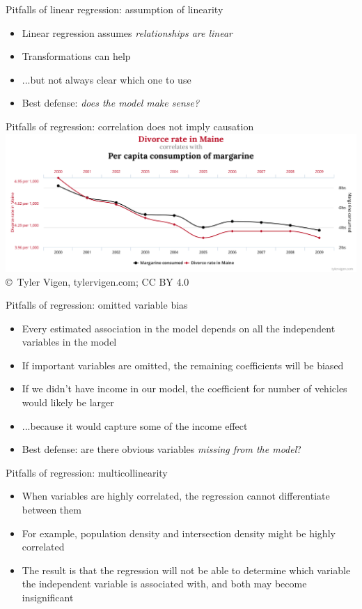 \begin{frame}{Pitfalls of linear regression: assumption of linearity}
  \begin{itemize}
    \item Linear regression assumes \emph{relationships are linear}
    \item Transformations can help
    \pause\item ...but not always clear which one to use
    \pause\item Best defense: \emph{does the model make sense?}
  \end{itemize}
\end{frame}

\begin{frame}{Pitfalls of regression: correlation does not imply causation}
  \includegraphics[width=\textwidth]{spurious_correlation.pdf}\\
  {\tiny \copyright~Tyler Vigen, tylervigen.com; CC BY 4.0}
\end{frame}

\begin{frame}{Pitfalls of regression: omitted variable bias}
  \begin{itemize}
    \item Every estimated association in the model depends on all the independent variables in the model
    \item If important variables are omitted, the remaining coefficients will be biased
    \item If we didn't have income in our model, the coefficient for number of vehicles would likely be larger
    \item ...because it would capture some of the income effect
    \pause\item Best defense: are there obvious variables \emph{missing from the model}?
  \end{itemize}
\end{frame}

\begin{frame}{Pitfalls of regression: multicollinearity}
  \begin{itemize}
    \item When variables are highly correlated, the regression cannot differentiate between them
    \item For example, population density and intersection density might be highly correlated
    \item The result is that the regression will not be able to determine which variable the independent variable is associated with, and both may become insignificant
  \end{itemize}
\end{frame}

